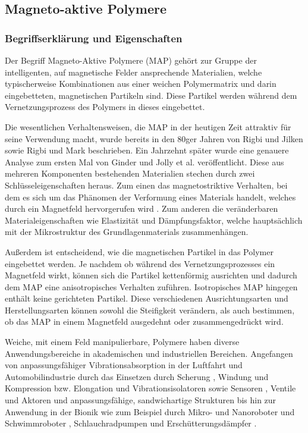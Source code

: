 \FloatBarrier
\subsection{Magneto-aktive Polymere}\label{kap_MAP}
\subsubsection*{Begriffserklärung und Eigenschaften}
Der Begriff Magneto-Aktive Polymere (MAP) gehört zur Gruppe der intelligenten, auf magnetische Felder ansprechende Materialien, welche typischerweise Kombinationen aus einer weichen Polymermatrix und darin eingebetteten, magnetischen Partikeln sind. Diese Partikel werden während dem Vernetzungsprozess des Polymers in dieses eingebettet. 

Die wesentlichen Verhaltensweisen, die MAP in der heutigen Zeit attraktiv für seine Verwendung macht, wurde bereits in den 80ger Jahren von Rigbi und Jilken \cite{Rigbi1} sowie Rigbi und Mark \cite{Rigbi2} beschrieben. Ein Jahrzehnt später wurde eine genauere Analyse zum ersten Mal von Ginder und Jolly et al. \cite{ginder} veröffentlicht. 
Diese aus mehreren Komponenten bestehenden Materialien stechen durch zwei Schlüsseleigenschaften heraus. 
Zum einen das magnetostriktive Verhalten, bei dem es sich um das Phänomen der Verformung eines Materials handelt, welches durch ein Magnetfeld hervorgerufen wird \cite{Martin_2006}.
Zum anderen die veränderbaren Materialeigenschaften wie Elastizität und Dämpfungsfaktor, welche hauptsächlich mit der Mikrostruktur des Grundlagenmaterials zusammenhängen. \cite{Varga1} \cite{Varga2}

Außerdem ist entscheidend, wie die magnetischen Partikel in das Polymer eingebettet werden. Je nachdem ob während des Vernetzungsprozesses ein Magnetfeld wirkt, können sich die Partikel kettenförmig ausrichten und dadurch dem MAP eine anisotropisches Verhalten zuführen. Isotropisches MAP hingegen enthält keine gerichteten Partikel. Diese verschiedenen Ausrichtungsarten und Herstellungsarten können sowohl die Steifigkeit verändern, als auch bestimmen, ob das MAP in einem Magnetfeld ausgedehnt oder zusammengedrückt wird. 

Weiche, mit einem Feld manipulierbare, Polymere haben diverse Anwendungsbereiche in akademischen und industriellen Bereichen. Angefangen von anpassungsfähiger Vibrationsabsorption in der Luftfahrt und Automobilindustrie durch das Einsetzen durch Scherung \cite{Ginder_Schlotter_Nichols} \cite{Deng_Gong}, Windung \cite{Hoang_Zhang_Li_Du} und Kompression bzw. Elongation \cite{Kallio_2007} und Vibrationsisolatoren \cite{Ginder_2000} sowie Sensoren \cite{Ginder_2000} \cite{Martin_2006}, Ventile und Aktoren \cite{Boese_2012} \cite{Keip_2014} und anpassungsfähige, sandwichartige Strukturen \cite{Zhou_2005} \cite{Zhou_2006} \cite{Wei_2008} bis hin zur Anwendung in der Bionik wie zum Beispiel durch Mikro- und Nanoroboter und Schwimmroboter \cite{Qiu_2015} \cite{Xu_2015} \cite{Lum_2016} \cite{Hu_2018}, Schlauchradpumpen \cite{Fuhrer_2013} und Erschütterungsdämpfer \cite{Li_2013}.

